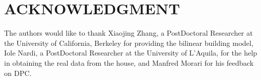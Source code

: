 \section*{ACKNOWLEDGMENT}
The authors would like to thank Xiaojing Zhang, a PostDoctoral Researcher at the University of California, Berkeley for providing the bilinear building model, Iole Nardi, a PostDoctoral Researcher at the University of L'Aquila, for the help in obtaining the real data from the house, and Manfred Morari for his feedback on DPC.